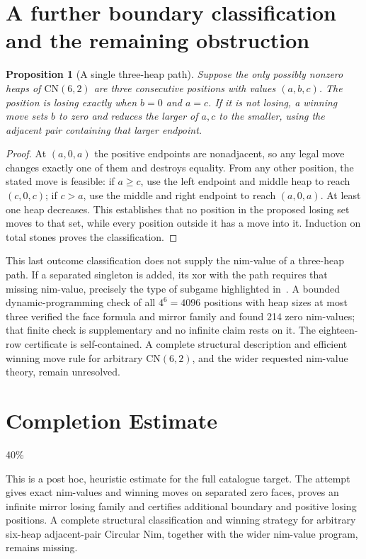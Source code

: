 \documentclass[11pt,a4paper]{article}
\newtheorem{proposition}[theorem]{Proposition}
\theoremstyle{definition}
\theoremstyle{remark}
\begin{document}
\section{A further boundary classification and the remaining obstruction}
\begin{proposition}[A single three-heap path]
Suppose the only possibly nonzero heaps of $\mathrm{CN}(6,2)$ are three consecutive positions with values $(a,b,c)$. The position is losing exactly when $b=0$ and $a=c$. If it is not losing, a winning move sets $b$ to zero and reduces the larger of $a,c$ to the smaller, using the adjacent pair containing that larger endpoint.
\end{proposition}
\begin{proof}
At $(a,0,a)$ the positive endpoints are nonadjacent, so any legal move changes exactly one of them and destroys equality. From any other position, the stated move is feasible: if $a\geq c$, use the left endpoint and middle heap to reach $(c,0,c)$; if $c>a$, use the middle and right endpoint to reach $(a,0,a)$. At least one heap decreases. This establishes that no position in the proposed losing set moves to that set, while every position outside it has a move into it. Induction on total stones proves the classification.
\end{proof}

This last outcome classification does not supply the nim-value of a three-heap path. If a separated singleton is added, its xor with the path requires that missing nim-value, precisely the type of subgame highlighted in~\cite{hora}. A bounded dynamic-programming check of all $4^6=4096$ positions with heap sizes at most three verified the face formula and mirror family and found 214 zero nim-values; that finite check is supplementary and no infinite claim rests on it. The eighteen-row certificate is self-contained. A complete structural description and efficient winning move rule for arbitrary $\mathrm{CN}(6,2)$, and the wider requested nim-value theory, remain unresolved.

\section{Completion Estimate}
40\%

This is a post hoc, heuristic estimate for the full catalogue target.
The attempt gives exact nim-values and winning moves on separated zero faces, proves an infinite mirror losing family and certifies additional boundary and positive losing positions. A complete structural classification and winning strategy for arbitrary six-heap adjacent-pair Circular Nim, together with the wider nim-value program, remains missing.
\end{document}
